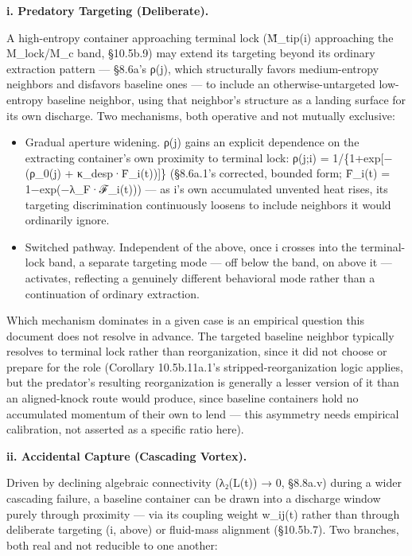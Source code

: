 \documentclass[
]{article}
\begin{document}
\textbf{i. Predatory Targeting (Deliberate).}

A high-entropy container approaching terminal lock (M̃\_tip(i)
approaching the M\_lock/M\_c band, §10.5b.9) may extend its targeting
beyond its ordinary extraction pattern --- §8.6a's ρ(j), which
structurally favors medium-entropy neighbors and disfavors baseline ones
--- to include an otherwise-untargeted low-entropy baseline neighbor,
using that neighbor's structure as a landing surface for its own
discharge. Two mechanisms, both operative and not mutually exclusive:

\begin{itemize}
\item
  Gradual aperture widening. ρ(j) gains an explicit dependence on the
  extracting container's own proximity to terminal lock: ρ(j;i) =
  1/\{1+exp{[}−(ρ\_0(j) + κ\_desp·F̄\_i(t)){]}\} (§8.6a.1's corrected,
  bounded form; F̄\_i(t) = 1−exp(−λ\_F·ℱ\_i(t))) --- as i's own
  accumulated unvented heat rises, its targeting discrimination
  continuously loosens to include neighbors it would ordinarily ignore.
\item
  Switched pathway. Independent of the above, once i crosses into the
  terminal-lock band, a separate targeting mode --- off below the band,
  on above it --- activates, reflecting a genuinely different behavioral
  mode rather than a continuation of ordinary extraction.
\end{itemize}

Which mechanism dominates in a given case is an empirical question this
document does not resolve in advance. The targeted baseline neighbor
typically resolves to terminal lock rather than reorganization, since it
did not choose or prepare for the role (Corollary 10.5b.11a.1's
stripped-reorganization logic applies, but the predator's resulting
reorganization is generally a lesser version of it than an aligned-knock
route would produce, since baseline containers hold no accumulated
momentum of their own to lend --- this asymmetry needs empirical
calibration, not asserted as a specific ratio here).

\textbf{ii. Accidental Capture (Cascading Vortex).}

Driven by declining algebraic connectivity (λ₂(L(t)) → 0, §8.8a.v)
during a wider cascading failure, a baseline container can be drawn into
a discharge window purely through proximity --- via its coupling weight
w\_ij(t) rather than through deliberate targeting (i, above) or
fluid-mass alignment (§10.5b.7). Two branches, both real and not
reducible to one another:
\end{document}
